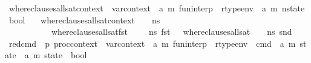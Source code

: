\begin{isabellebody}
\isanewline
\isanewline
{}\isamarkupfalse%
\ where{\isacharunderscore}{\kern0pt}clauses{\isacharunderscore}{\kern0pt}all{\isacharunderscore}{\kern0pt}sat{\isacharunderscore}{\kern0pt}context\ {\isacharcolon}{\kern0pt}{\isacharcolon}{\kern0pt}\ {\isachardoublequoteopen}var{\isacharunderscore}{\kern0pt}context\ {\isasymRightarrow}\ {\isacharparenleft}{\kern0pt}{\isacharprime}{\kern0pt}a{\isacharcomma}{\kern0pt}\ {\isacharprime}{\kern0pt}m{\isacharparenright}{\kern0pt}\ fun{\isacharunderscore}{\kern0pt}interp\ {\isasymRightarrow}\ rtype{\isacharunderscore}{\kern0pt}env\ {\isacharequal}{\kern0pt}{\isachargreater}{\kern0pt}\ {\isacharparenleft}{\kern0pt}{\isacharprime}{\kern0pt}a{\isacharcomma}{\kern0pt}\ {\isacharprime}{\kern0pt}m{\isacharparenright}{\kern0pt}\ nstate\ {\isasymRightarrow}\ bool{\isachardoublequoteclose}\isanewline
\ \ \ {\isachardoublequoteopen}where{\isacharunderscore}{\kern0pt}clauses{\isacharunderscore}{\kern0pt}all{\isacharunderscore}{\kern0pt}sat{\isacharunderscore}{\kern0pt}context\ {\isasymLambda}\ {\isasymGamma}\ {\isasymOmega}\ ns\ {\isasymequiv}\ \isanewline
\ \ \ \ \ \ \ \ \ \ \ where{\isacharunderscore}{\kern0pt}clauses{\isacharunderscore}{\kern0pt}all{\isacharunderscore}{\kern0pt}sat{\isacharparenleft}{\kern0pt}fst\ {\isasymLambda}{\isacharcomma}{\kern0pt}\ {\isacharbrackleft}{\kern0pt}{\isacharbrackright}{\kern0pt}{\isacharparenright}{\kern0pt}\ {\isasymGamma}\ {\isasymOmega}\ ns\ {\isacharparenleft}{\kern0pt}fst\ {\isasymLambda}{\isacharparenright}{\kern0pt}\ {\isasymand}\ where{\isacharunderscore}{\kern0pt}clauses{\isacharunderscore}{\kern0pt}all{\isacharunderscore}{\kern0pt}sat\ {\isasymLambda}\ {\isasymGamma}\ {\isasymOmega}\ ns\ {\isacharparenleft}{\kern0pt}snd\ {\isasymLambda}{\isacharparenright}{\kern0pt}{\isachardoublequoteclose}%
\isadelimdocument
%
\endisadelimdocument
%
\isatagdocument
%
\isamarkuptrue%
%
\endisatagdocument
{\isafolddocument}%
%
\isadelimdocument
%
\endisadelimdocument
{}\isamarkupfalse%
\ red{\isacharunderscore}{\kern0pt}cmd\ {\isacharcolon}{\kern0pt}{\isacharcolon}{\kern0pt}\ {\isachardoublequoteopen}{\isacharprime}{\kern0pt}p\ proc{\isacharunderscore}{\kern0pt}context\ {\isasymRightarrow}\ var{\isacharunderscore}{\kern0pt}context\ {\isasymRightarrow}\ {\isacharparenleft}{\kern0pt}{\isacharprime}{\kern0pt}a{\isacharcomma}{\kern0pt}\ {\isacharprime}{\kern0pt}m{\isacharparenright}{\kern0pt}\ fun{\isacharunderscore}{\kern0pt}interp\ {\isasymRightarrow}\ rtype{\isacharunderscore}{\kern0pt}env\ {\isasymRightarrow}\ cmd\ {\isasymRightarrow}\ {\isacharparenleft}{\kern0pt}{\isacharprime}{\kern0pt}a{\isacharcomma}{\kern0pt}\ {\isacharprime}{\kern0pt}m{\isacharparenright}{\kern0pt}\ state\ {\isasymRightarrow}\ {\isacharparenleft}{\kern0pt}{\isacharprime}{\kern0pt}a{\isacharcomma}{\kern0pt}\ {\isacharprime}{\kern0pt}m{\isacharparenright}{\kern0pt}\ state\ {\isasymRightarrow}\ bool{\isachardoublequoteclose}\isanewline

\end{isabellebody}
